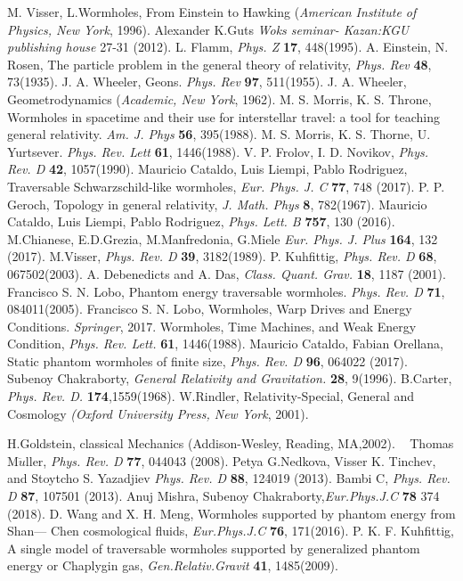 \documentclass[10pt]{revtex4}
\begin{document}
\begin{thebibliography}{58}
	 M. Visser, L.Wormholes, From Einstein to Hawking ({\it American Institute of Physics, New York}, 1996).
	 Alexander K.Guts  {\it Woks seminar- Kazan:KGU publishing house} 27-31 (2012).
	 L. Flamm, {\it Phys. Z} {\bf 17}, 448(1995).
	 A. Einstein, N. Rosen, The particle problem in the general theory of relativity, {\it Phys. Rev} {\bf 48}, 73(1935).
	 J. A. Wheeler, Geons. {\it Phys. Rev} {\bf 97}, 511(1955).
	 J. A. Wheeler, Geometrodynamics ({\it Academic, New York}, 1962).
	 M. S. Morris, K. S. Throne, Wormholes in spacetime and their use for interstellar travel: a tool for teaching general relativity. {\it Am. J. Phys} {\bf 56}, 395(1988).
	 M. S. Morris, K. S. Thorne, U. Yurtsever. {\it Phys. Rev. Lett} {\bf 61}, 1446(1988).
	 V. P. Frolov, I. D. Novikov, {\it Phys. Rev. D} {\bf 42}, 1057(1990).
	 Mauricio Cataldo, Luis Liempi, Pablo Rodriguez, Traversable Schwarzschild-like wormholes, {\it Eur. Phys. J. C} {\bf 77}, 748 (2017).
	 P. P. Geroch, Topology in general relativity, {\it J. Math. Phys} {\bf 8}, 782(1967).
	 Mauricio Cataldo, Luis Liempi, Pablo Rodriguez, {\it Phys. Lett. B} {\bf 757}, 130 (2016).
	 M.Chianese, E.D.Grezia, M.Manfredonia, G.Miele {\it Eur. Phys. J. Plus} {\bf 164}, 132 (2017).
	 M.Visser, {\it Phys. Rev. D} {\bf 39}, 3182(1989).
	 P. Kuhfittig, {\it Phys. Rev. D} {\bf 68}, 067502(2003).
	 A. Debenedicts and A. Das, {\it Class. Quant. Grav.} {\bf 18}, 1187 (2001).
	 Francisco S. N. Lobo, Phantom energy traversable wormholes. {\it Phys. Rev. D}  {\bf 71}, 084011(2005).
	 Francisco S. N. Lobo, Wormholes, Warp Drives and Energy Conditions. {\it Springer}, 2017.
	 Wormholes, Time Machines, and Weak Energy Condition, {\it Phys. Rev. Lett.} {\bf 61}, 1446(1988).
	 Mauricio Cataldo, Fabian Orellana, Static phantom wormholes of finite size, {\it Phys. Rev. D} {\bf 96}, 064022 (2017).
	 Subenoy Chakraborty, {\it General Relativity and Gravitation.} {\bf 28}, 9(1996).
	 B.Carter, {\it Phys. Rev. D.} {\bf 174},1559(1968).
	 W.Rindler, Relativity-Special, General and Cosmology {\it (Oxford University Press, New York}, 2001).
	
	 H.Goldstein, classical Mechanics (Addison-Wesley, Reading, MA,2002). 
	\
	 Thomas M$\ddot u$ller, {\it Phys. Rev. D} {\bf 77}, 044043 (2008).
	\bibitem{r25} Petya G.Nedkova, Visser K. Tinchev, and Stoytcho S. Yazadjiev {\it Phys. Rev. D} {\bf 88}, 124019 (2013).
	\bibitem{r27} Bambi C, {\it Phys. Rev. D} {\bf 87}, 107501 (2013).
	\bibitem{r28} Anuj Mishra, Subenoy Chakraborty,{\it  Eur.Phys.J.C} {\bf 78} 374 (2018).
	\bibitem{r29} D. Wang and X. H. Meng,
	Wormholes supported by phantom energy from Shan—
	Chen cosmological fluids, {\it Eur.Phys.J.C} {\bf 76}, 171(2016).
	 P. K. F. Kuhfittig, A single model of traversable wormholes supported by generalized phantom energy or Chaplygin gas, {\it Gen.Relativ.Gravit} {\bf 41}, 1485(2009).
	
\end{thebibliography}
\end{document}
